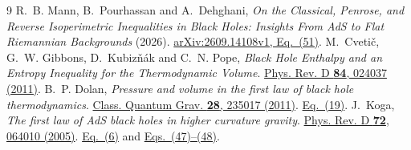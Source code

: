 \documentclass[11pt,a4paper]{article}
\begin{document}
\begin{thebibliography}{9}\small
{} R.~B. Mann, B.~Pourhassan and A.~Dehghani,
\emph{On the Classical, Penrose, and Reverse Isoperimetric Inequalities in Black Holes: Insights From AdS to Flat Riemannian Backgrounds} (2026).
\href{https://arxiv.org/html/2609.14108v1#S5.E51}{arXiv:2609.14108v1, Eq.~(51)}.
 M.~Cvetič, G.~W. Gibbons, D.~Kubizňák and C.~N. Pope,
\emph{Black Hole Enthalpy and an Entropy Inequality for the Thermodynamic Volume}.
\href{https://doi.org/10.1103/PhysRevD.84.024037}{Phys. Rev. D \textbf{84}, 024037 (2011)}.
 B.~P. Dolan, \emph{Pressure and volume in the first law of black hole thermodynamics}.
\href{https://doi.org/10.1088/0264-9381/28/23/235017}{Class. Quantum Grav. \textbf{28}, 235017 (2011)}.
\href{https://arxiv.org/html/1106.6260#S2.E19}{Eq.~(19)}.
 J.~Koga, \emph{The first law of AdS black holes in higher curvature gravity}.
\href{https://doi.org/10.1103/PhysRevD.72.064010}{Phys. Rev. D \textbf{72}, 064010 (2005)}.
\href{https://arxiv.org/html/hep-th/0505219#S2.E6}{Eq.~(6)} and
\href{https://arxiv.org/html/hep-th/0505219#S3.E48}{Eqs.~(47)--(48)}.
\end{thebibliography}
\end{document}
